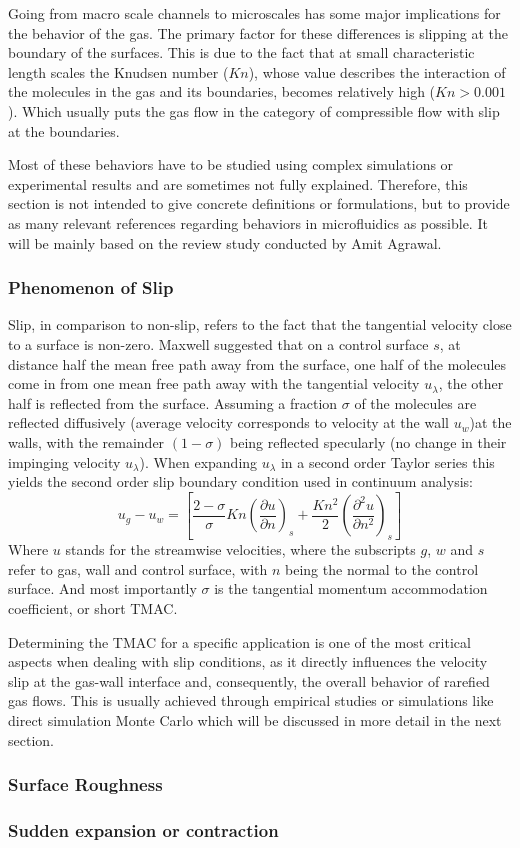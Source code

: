 Going from macro scale channels to microscales has some major implications for the behavior of the gas.
The primary factor for these differences is slipping at the boundary of the surfaces.
This is due to the fact that at small characteristic length scales the Knudsen number ($Kn$), whose value describes the interaction of the molecules in the gas and its boundaries, becomes relatively high ($Kn > 0.001$).
Which usually puts the gas flow in the category of compressible flow with slip at the boundaries.

Most of these behaviors have to be studied using complex simulations or experimental results and are sometimes not fully explained.
Therefore, this section is not intended to give concrete definitions or formulations, but to provide as many relevant references regarding behaviors in microfluidics as possible.
It will be mainly based on the review study conducted by Amit Agrawal.
\cite{agrawal_comprehensive_2011}

\subsubsection*{Phenomenon of Slip}
Slip, in comparison to non-slip, refers to the fact that the tangential velocity close to a surface is non-zero.
Maxwell suggested that on a control surface $s$, at distance half the mean free path away from the surface, one half of the molecules come in from one mean free path away with the tangential velocity $u_\lambda$, the other half is reflected from the surface.
Assuming a fraction $\sigma$ of the molecules are reflected diffusively (average velocity corresponds to velocity at the wall $u_w$)at the walls, with the remainder $(1-\sigma)$ being reflected specularly (no change in their impinging velocity $u_\lambda$).
When expanding $u_\lambda$ in a second order Taylor series this yields the second order slip boundary condition used in continuum analysis:
$$
	u_g - u_w =
	\left[
		\frac{2-\sigma}{\sigma}Kn\left(\frac{\partial u}{\partial n}\right)_s
		+ \frac{Kn^2}{2} \left(\frac{\partial^2 u}{\partial n^2}\right)_s
	\right]
$$ 
Where $u$ stands for the streamwise velocities, where the subscripts $g$, $w$ and $s$ refer to gas, wall and control surface, with $n$ being the normal to the control surface.
And most importantly $\sigma$ is the tangential momentum accommodation coefficient, or short TMAC.

Determining the TMAC for a specific application is one of the most critical aspects when dealing with slip conditions, as it directly influences the velocity slip at the gas-wall interface and, consequently, the overall behavior of rarefied gas flows.
This is usually achieved through empirical studies or simulations like direct simulation Monte Carlo which will be discussed in more detail in the next section.

\subsubsection*{Surface Roughness}

\subsubsection*{Sudden expansion or contraction}
